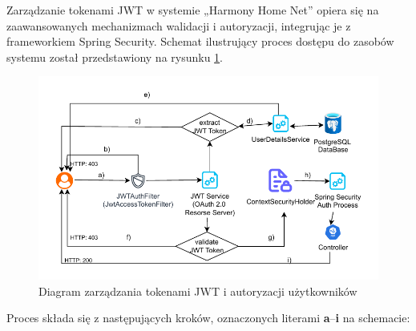 Zarządzanie tokenami JWT w systemie „Harmony Home Net” opiera się na zaawansowanych mechanizmach walidacji i autoryzacji, integrując je z frameworkiem Spring Security. Schemat ilustrujący proces dostępu do zasobów systemu został przedstawiony na rysunku \ref{fig:resource_access_flow}.

\begin{figure}[ht]
    \centering
    \includegraphics[width=.9\linewidth]{rys03/Diagram_dotępu_do_zasobów_systemu}
    \caption{Diagram zarządzania tokenami JWT i autoryzacji użytkowników~\cite{JWToauth}}
    \label{fig:resource_access_flow}
\end{figure}

Proces składa się z następujących kroków, oznaczonych literami \textbf{a}–\textbf{i} na schemacie:

